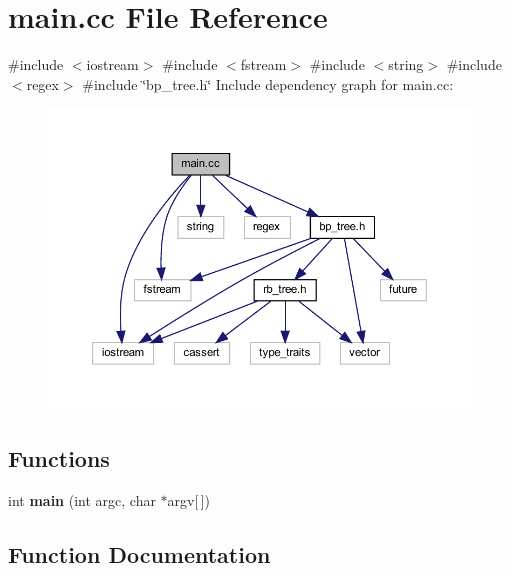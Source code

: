 \section{main.\+cc File Reference}
\label{main_8cc}
{\ttfamily \#include $<$iostream$>$}\newline
{\ttfamily \#include $<$fstream$>$}\newline
{\ttfamily \#include $<$string$>$}\newline
{\ttfamily \#include $<$regex$>$}\newline
{\ttfamily \#include \char`\"{}bp\+\_\+tree.\+h\char`\"{}}\newline
Include dependency graph for main.\+cc\+:
\nopagebreak
\begin{figure}[H]
\begin{center}
\leavevmode
\includegraphics[width=350pt]{main_8cc__incl}
\end{center}
\end{figure}
\subsection*{Functions}
\begin{DoxyCompactItemize}
\item 
int \textbf{ main} (int argc, char $\ast$argv[$\,$])
\end{DoxyCompactItemize}


\subsection{Function Documentation}
\mbox{\label{main_8cc_a0ddf1224851353fc92bfbff6f499fa97}} 

